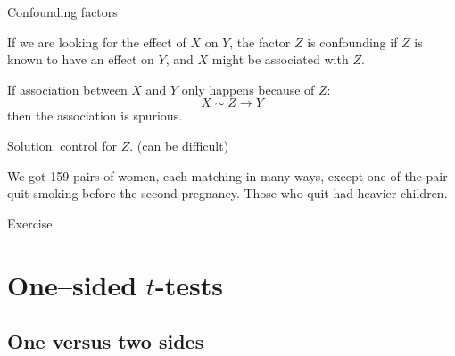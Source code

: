 %
\begin{frame}{Confounding factors}

If we are looking for the effect of $X$ on $Y$,
the factor $Z$ is \alert{confounding} if $Z$ is known to have an effect on $Y$,
and $X$ might be associated with $Z$.

\vspace{2em}

If association between $X$ and $Y$ only happens because of $Z$:
\[
  X \sim Z \longrightarrow Y
\]
then the association is \alert{spurious}.

\vspace{2em}

\alert{Solution:} control for $Z$.  (can be difficult)

\vspace{2em}

 We got 159 pairs of women,
    each matching in many ways, except one of the pair quit smoking before the second pregnancy.
    Those who quit had heavier children.

\end{frame}

\begin{frame}{Exercise}



\end{frame}


\section{One--sided $t$-tests}

\subsection{One versus two sides}

